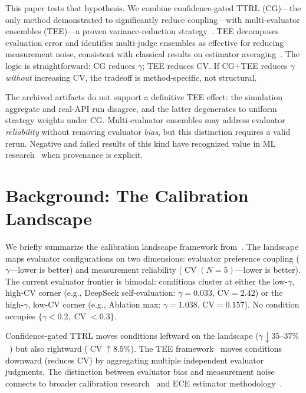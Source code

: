 \documentclass[11pt]{article}
\DeclareMathOperator{\CV}{CV}
\begin{document}
This paper tests that hypothesis. We combine confidence-gated TTRL (CG)---the only method demonstrated to significantly reduce coupling---with multi-evaluator ensembles (TEE)---a proven variance-reduction strategy~\cite{messing2026tee}. TEE decomposes evaluation error and identifies multi-judge ensembles as effective for reducing measurement noise, consistent with classical results on estimator averaging~\cite{bubeck2012regret}. The logic is straightforward: CG reduces $\gamma$; TEE reduces CV. If CG+TEE reduces $\gamma$ \textit{without} increasing CV, the tradeoff is method-specific, not structural.

The archived artifacts do not support a definitive TEE effect: the simulation aggregate and real-API run disagree, and the latter degenerates to uniform strategy weights under CG. Multi-evaluator ensembles may address evaluator \textit{reliability} without removing evaluator \textit{bias}, but this distinction requires a valid rerun. Negative and failed results of this kind have recognized value in ML research~\cite{dodge2019reproducibility} when provenance is explicit.

\section{Background: The Calibration Landscape}

We briefly summarize the calibration landscape framework from~\cite{liu2026caleffects}. The landscape maps evaluator configurations on two dimensions: evaluator preference coupling ($\gamma$---lower is better) and measurement reliability ($\CV(N{=}5)$---lower is better). The current evaluator frontier is bimodal: conditions cluster at either the low-$\gamma$, high-CV corner (e.g., DeepSeek self-evaluation: $\gamma{=}0.033$, CV${=}2.42$) or the high-$\gamma$, low-CV corner (e.g., Ablation max: $\gamma{=}1.038$, CV${=}0.157$). No condition occupies $\{\gamma < 0.2, \CV < 0.3\}$.

Confidence-gated TTRL moves conditions leftward on the landscape ($\gamma \downarrow 35$--$37\%$~\cite{liu2026caleffects}) but also rightward ($\CV \uparrow 8.5\%$). The TEE framework~\cite{messing2026tee} moves conditions downward (reduces CV) by aggregating multiple independent evaluator judgments. The distinction between evaluator bias and measurement noise connects to broader calibration research~\cite{guo2017calibration,niculescu2005predicting,kull2017temperature} and ECE estimator methodology~\cite{kumar2019verified,nixon2019measuring,roelofs2022mitigating}.
\end{document}
